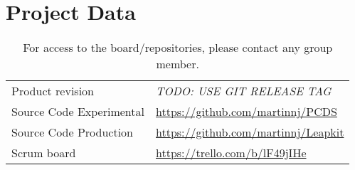 \section{Project Data}

\begin{table}[h!]
    \begin{tabular}{l|l}
        Product revision         & \emph{TODO: USE GIT RELEASE TAG} \\
        Source Code Experimental & \url{https://github.com/martinnj/PCDS}\\
        Source Code Production   & \url{https://github.com/martinnj/Leapkit}\\
        Scrum board              & \url{https://trello.com/b/lF49jIHe}
    \end{tabular}
    \label{tab:projdata}
    \caption{For access to the board/repositories, please contact any group member.}
\end{table}
